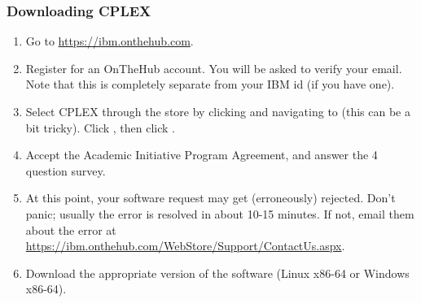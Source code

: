 \documentclass[12pt]{article}
\begin{document}
\subsubsection{Downloading CPLEX}
\begin{enumerate}
    \item Go to \url{https://ibm.onthehub.com}.
    \item Register for an OnTheHub account.
        You will be asked to verify your email.
        Note that this is completely separate from your IBM id (if you have one).
    \item Select CPLEX through the store by clicking  and navigating to  (this can be a bit tricky). 
        Click , then click .
    \item Accept the Academic Initiative Program Agreement, and answer the 4 question survey.
    \item At this point, your software request may get (erroneously) rejected.
        Don't panic; usually the error is resolved in about 10-15 minutes.
        If not, email them about the error at \url{https://ibm.onthehub.com/WebStore/Support/ContactUs.aspx}.
    \item Download the appropriate version of the software (Linux x86-64 or Windows x86-64).
\end{enumerate}
\end{document}
